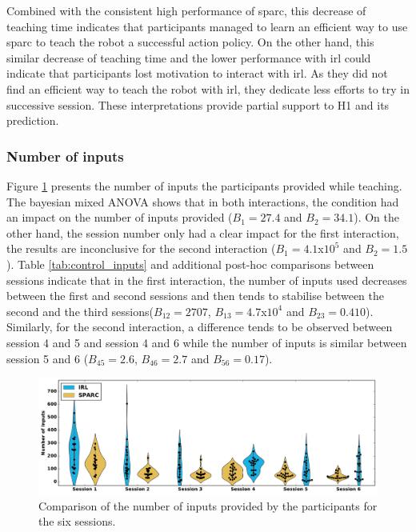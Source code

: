 Combined with the consistent high performance of \gls{sparc}, this decrease of teaching time indicates that participants managed to learn an efficient way to use \gls{sparc} to teach the robot a successful action policy. On the other hand, this similar decrease of teaching time and the lower performance with \gls{irl} could indicate that participants lost motivation to interact with \gls{irl}. As they did not find an efficient way to teach the robot with \gls{irl}, they dedicate less efforts to try in successive session. These interpretations provide partial support to H1 and its prediction.

\subsubsection{Number of inputs}
Figure \ref{fig:control_inputs} presents the number of inputs the participants provided while teaching. The bayesian mixed ANOVA shows that in both interactions, the condition had an impact on the number of inputs provided ($B_1=27.4$ and $B_2 = 34.1$). On the other hand,  the session number only had a clear impact for the first interaction, the results are inconclusive for the second interaction ($B_1=4.1$x$10^5$ and $B_2 = 1.5$). Table \ref{tab:control_inputs} and additional post-hoc comparisons between sessions indicate that in the first interaction, the number of inputs used decreases between the first and second sessions and then tends to stabilise between the second and the third sessions($B_{12}=2707$, $B_{13}=4.7$x$10^4$ and $B_{23}=0.410$). Similarly, for the second interaction, a difference tends to be observed between session 4 and 5 and session 4 and 6 while the number of inputs is similar between session 5 and 6 ($B_{45}=2.6$, $B_{46}=2.7$ and $B_{56}=0.17$).

\begin{figure}[ht]
	\includegraphics[width=\textwidth]{inputs.pdf}
	\centering
	\caption{Comparison of the number of inputs provided by the participants for the six sessions. 
	}
	\label{fig:control_inputs}
\end{figure}

